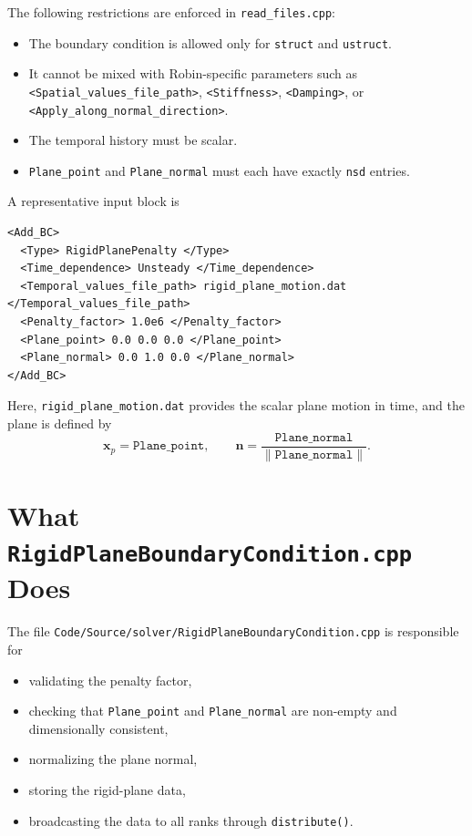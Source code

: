 \documentclass[11pt]{article}
\begin{document}
The following restrictions are enforced in \texttt{read\_files.cpp}:

\begin{itemize}[leftmargin=*]
\item The boundary condition is allowed only for \texttt{struct} and
\texttt{ustruct}.
\item It cannot be mixed with Robin-specific parameters such as
\texttt{<Spatial\_values\_file\_path>}, \texttt{<Stiffness>},
\texttt{<Damping>}, or \texttt{<Apply\_along\_normal\_direction>}.
\item The temporal history must be scalar.
\item \texttt{Plane\_point} and \texttt{Plane\_normal} must each have exactly
\texttt{nsd} entries.
\end{itemize}

A representative input block is

\begin{verbatim}
<Add_BC>
  <Type> RigidPlanePenalty </Type>
  <Time_dependence> Unsteady </Time_dependence>
  <Temporal_values_file_path> rigid_plane_motion.dat </Temporal_values_file_path>
  <Penalty_factor> 1.0e6 </Penalty_factor>
  <Plane_point> 0.0 0.0 0.0 </Plane_point>
  <Plane_normal> 0.0 1.0 0.0 </Plane_normal>
</Add_BC>
\end{verbatim}

Here, \texttt{rigid\_plane\_motion.dat} provides the scalar plane motion in time,
and the plane is defined by
\[
\mathbf{x}_p = \texttt{Plane\_point},
\qquad
\mathbf{n} = \frac{\texttt{Plane\_normal}}{\|\texttt{Plane\_normal}\|}.
\]

\section{What \texttt{RigidPlaneBoundaryCondition.cpp} Does}

The file \texttt{Code/Source/solver/RigidPlaneBoundaryCondition.cpp} is
responsible for

\begin{itemize}[leftmargin=*]
\item validating the penalty factor,
\item checking that \texttt{Plane\_point} and \texttt{Plane\_normal} are
non-empty and dimensionally consistent,
\item normalizing the plane normal,
\item storing the rigid-plane data,
\item broadcasting the data to all ranks through \texttt{distribute()}.
\end{itemize}
\end{document}
